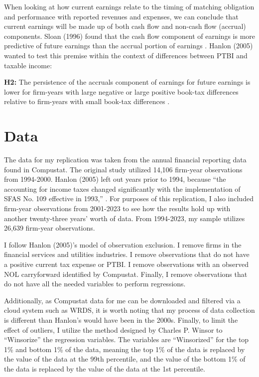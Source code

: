 \documentclass{article}
\begin{document}
When looking at how current earnings relate to the timing of matching obligation and performance with reported revenues and expenses, we can conclude that current earnings will be made up of both cash flow and non-cash flow (accrual) components. Sloan (1996) found that the cash flow component of earnings is more predictive of future earnings than the accrual portion of earnings \citet{Sloan96}. Hanlon (2005) wanted to test this premise within the context of differences between PTBI and taxable income:

\textbf{H2:} The persistence of the accruals component of earnings for future earnings is lower for firm-years with large negative or large positive book-tax differences relative to firm-years with small book-tax differences \citet{Hanlon05}. 

\section{Data}
The data for my replication was taken from the annual financial reporting data found in Compustat. The original study utilized 14,106 firm-year observations from 1994-2000. Hanlon (2005) left out years prior to 1994, because “the accounting for income taxes changed significantly with the implementation of SFAS No. 109 effective in 1993,” \citet{Hanlon05}. For purposes of this replication, I also included firm-year observations from 2001-2023 to see how the results hold up with another twenty-three years’ worth of data. From 1994-2023, my sample utilizes 26,639 firm-year observations.

I follow Hanlon (2005)’s model of observation exclusion. I remove firms in the financial services and utilities industries. I remove observations that do not have a positive current tax expense or PTBI. I remove observations with an observed NOL carryforward identified by Compustat. Finally, I remove observations that do not have all the needed variables to perform regressions.

Additionally, as Compustat data for me can be downloaded and filtered via a cloud system such as WRDS, it is worth noting that my process of data collection is different than Hanlon’s would have been in the 2000s. Finally, to limit the effect of outliers, I utilize the method designed by Charles P. Winsor to “Winsorize” the regression variables. The variables are “Winsorized” for the top 1\% and bottom 1\% of the data, meaning the top 1\% of the data is replaced by the value of the data at the 99th percentile, and the value of the bottom 1\% of the data is replaced by the value of the data at the 1st percentile. 
\end{document}
